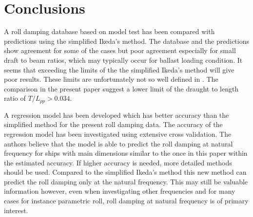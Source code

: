 \section{Conclusions}
\label{se:conclusions}
A roll damping database based on model test has been compared with predictions using  the simplified Ikeda's method. The database and the predictions show agreement for some of the cases but poor agreement especially for small draft to beam ratios, which may typically occur for ballast loading condition. It seems that exceeding the limits of the the simplified Ikeda's method will give poor results. These limits are unfortunately not so well defined in \parencite{kawahara_simple_2011}. The comparison in the present paper suggest a lower limit of the draught to length ratio of $T/L_{pp}>0.034$.

A regression model has been developed which has better accuracy than the simplified method for the present roll damping data. The accuracy of the regression model has been investigated using extensive cross validation. The authors believe that the model is able to predict the roll damping at natural frequency for ships with main dimensions similar to the once in this paper within the estimated accuracy. If higher accuracy is needed, more detailed methods should be used. Compared to the simplified Ikeda's method this new method can predict the roll damping only at the natural frequency. This may still be valuable information however, even when investigating other frequencies and for many cases for instance parametric roll, roll damping at natural frequency is of primary interest.

